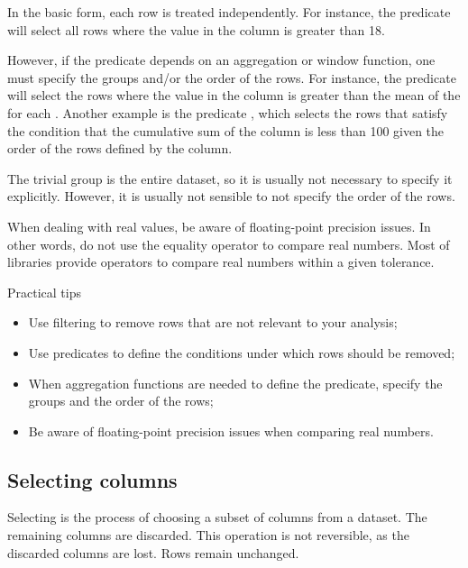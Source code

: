 In the basic form, each row is treated independently.  For instance, the predicate
 will select all rows where the value in the  column is
greater than 18.

However, if the predicate depends on an aggregation or window function, one must specify
the groups and/or the order of the rows.  For instance, the predicate  will select the rows where the value in the 
column is greater than the mean of the  for each . Another
example is the predicate , which selects the rows
that satisfy the condition that the cumulative sum of the  column is less
than 100 given the order of the rows defined by the  column.

The trivial group is the entire dataset, so it is usually not necessary to specify it
explicitly.  However, it is usually not sensible to not specify the order of the rows.

When dealing with real values, be aware of floating-point precision issues.  In other
words, do not use the equality operator to compare real numbers.  Most of libraries
provide operators to compare real numbers within a given tolerance.

\begin{hlbox}{Practical tips}
  \begin{itemize}
    \item Use filtering to remove rows that are not relevant to your analysis;
    \item Use predicates to define the conditions under which rows should be removed;
    \item When aggregation functions are needed to define the predicate, specify the groups and
      the order of the rows;
    \item Be aware of floating-point precision issues when comparing real numbers.
  \end{itemize}
\end{hlbox}

\subsection{Selecting columns}

Selecting is the process of choosing a subset of columns from a dataset.  The remaining
columns are discarded.  This operation is not reversible, as the discarded columns are
lost.  Rows remain unchanged.

